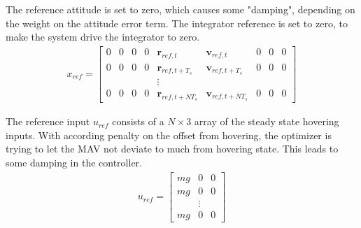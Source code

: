 The reference attitude is set to zero, which causes some "damping", depending on the weight on the attitude error term. The integrator reference is set to zero, to make the system drive the integrator to zero.
\begin{align}
x_{ref} = \begin{bmatrix}
0 & 0 & 0 & 0 & \mathbf{r}_{ref,t} & \mathbf{v}_{ref,t} & 0 & 0 & 0 \\
0 & 0 & 0 & 0 & \mathbf{r}_{ref,t+T_s} & \mathbf{v}_{ref,t+T_s} & 0 & 0 & 0 \\
 &  &  &  & \vdots &  &  &  &  \\
0 & 0 & 0 & 0 & \mathbf{r}_{ref,t+NT_s} & \mathbf{v}_{ref,t+NT_s} & 0 & 0 & 0 
\end{bmatrix}
\end{align}

The reference input $u_{ref}$ consists of a $N\times3$ array of the steady state hovering inputs. With according penalty on the offset from hovering, the optimizer is trying to let the MAV not deviate to much from hovering state. This leads to some damping in the controller.
\begin{align}
u_{ref} = \begin{bmatrix}
mg & 0 & 0 \\
mg & 0 & 0 \\
  & \vdots &  \\
mg & 0 & 0 
\end{bmatrix}
\end{align}
